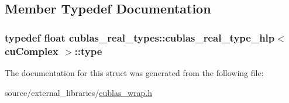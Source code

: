 \subsection{Member Typedef Documentation}
\hypertarget{structcublas__real__types_1_1cublas__real__type__hlp_3_01cuComplex_01_4_a0d3a1211ab64a0a4782bbb8f34e9a727}{
\subsubsection[{type}]{\setlength{\rightskip}{0pt plus 5cm}typedef float {\bf cublas\-\_\-real\-\_\-types\-::cublas\-\_\-real\-\_\-type\-\_\-hlp}$<$ cu\-Complex $>$\-::{\bf type}}}\label{structcublas__real__types_1_1cublas__real__type__hlp_3_01cuComplex_01_4_a0d3a1211ab64a0a4782bbb8f34e9a727}


The documentation for this struct was generated from the following file\-:\begin{DoxyCompactItemize}
\item 
source/external\-\_\-libraries/\hyperlink{cublas__wrap_8h}{cublas\-\_\-wrap.\-h}\end{DoxyCompactItemize}
